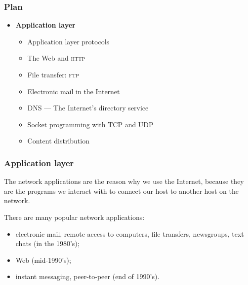 
%
\begin{frame}
\frametitle{Plan}

\begin{itemize}

  \item \textbf{Application layer}

  \begin{itemize}

    \item Application layer protocols

    \item The Web and \textsc{http}

    \item File transfer: \textsc{ftp}

    \item Electronic mail in the Internet

    \item DNS --- The Internet's directory service

    \item Socket programming with TCP and UDP

    \item Content distribution

  \end{itemize}

\end{itemize}

\end{frame}

%
\begin{frame}
\frametitle{Application layer}

The network applications are the reason why we use the Internet,
because they are the programs we interact with to connect our host
to another host on the network.

\bigskip

There are many popular network applications:
\begin{itemize}

  \item electronic mail, remote access to computers, file
  transfers, newsgroups, text chats (in the 1980's);

  \item Web (mid-1990's);

  \item instant messaging, peer-to-peer (end of 1990's).

\end{itemize}

\end{frame}

